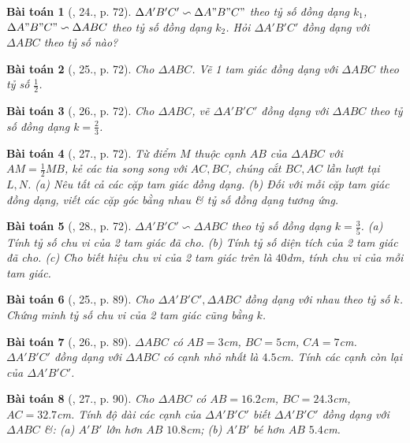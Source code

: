 \documentclass{article}
\newtheorem{baitoan}{Bài toán}
\begin{document}
\begin{baitoan}[\cite{SGK_Toan_8_tap_2}, 24., p. 72]
	$\Delta A'B'C'\backsim\Delta A"B"C"$ theo tỷ số đồng dạng $k_1$, $\Delta A"B"C"\backsim\Delta ABC$ theo tỷ số đồng dạng $k_2$. Hỏi $\Delta A'B'C'$ đồng dạng với $\Delta ABC$ theo tỷ số nào?
\end{baitoan}

\begin{baitoan}[\cite{SGK_Toan_8_tap_2}, 25., p. 72]
	Cho $\Delta ABC$. Vẽ 1 tam giác đồng dạng với $\Delta ABC$ theo tỷ số $\frac{1}{2}$.
\end{baitoan}

\begin{baitoan}[\cite{SGK_Toan_8_tap_2}, 26., p. 72]
	Cho $\Delta ABC$, vẽ $\Delta A'B'C'$ đồng dạng với $\Delta ABC$ theo tỷ số đồng dạng $k = \frac{2}{3}$.
\end{baitoan}

\begin{baitoan}[\cite{SGK_Toan_8_tap_2}, 27., p. 72]
	Từ điểm $M$ thuộc cạnh $AB$ của $\Delta ABC$ với $AM = \frac{1}{2}MB$, kẻ các tia song song với $AC,BC$, chúng cắt $BC,AC$ lần lượt tại $L,N$. (a) Nêu tất cả các cặp tam giác đồng dạng. (b) Đối với mỗi cặp tam giác đồng dạng, viết các cặp góc bằng nhau \& tỷ số đồng dạng tương ứng.	
\end{baitoan}

\begin{baitoan}[\cite{SGK_Toan_8_tap_2}, 28., p. 72]
	$\Delta A'B'C'\backsim\Delta ABC$ theo tỷ số đồng dạng $k = \frac{3}{5}$. (a) Tính tỷ số chu vi của 2 tam giác đã cho. (b) Tính tỷ số diện tích của 2 tam giác đã cho. (c) Cho biết hiệu chu vi của 2 tam giác trên là $40$\emph{dm}, tính chu vi của mỗi tam giác.
\end{baitoan}

\begin{baitoan}[\cite{SBT_Toan_8_tap_2}, 25., p. 89]
	Cho $\Delta A'B'C',\Delta ABC$ đồng dạng với nhau theo tỷ số $k$. Chứng minh tỷ số chu vi của 2 tam giác cũng bằng $k$.
\end{baitoan}

\begin{baitoan}[\cite{SBT_Toan_8_tap_2}, 26., p. 89]
	$\Delta ABC$ có $AB = 3$\emph{cm}, $BC = 5$\emph{cm}, $CA = 7$\emph{cm}. $\Delta A'B'C'$ đồng dạng với $\Delta ABC$ có cạnh nhỏ nhất là $4.5$\emph{cm}. Tính các cạnh còn lại của $\Delta A'B'C'$.
\end{baitoan}

\begin{baitoan}[\cite{SBT_Toan_8_tap_2}, 27., p. 90]
	Cho $\Delta ABC$ có $AB = 16.2$\emph{cm}, $BC = 24.3$\emph{cm}, $AC = 32.7$\emph{cm}. Tính độ dài các cạnh của $\Delta A'B'C'$ biết $\Delta A'B'C'$ đồng dạng với $\Delta ABC$ \&: (a) $A'B'$ lớn hơn $AB$ $10.8$\emph{cm}; (b) $A'B'$ bé hơn $AB$ $5.4$\emph{cm}.
\end{baitoan}
\end{document}
